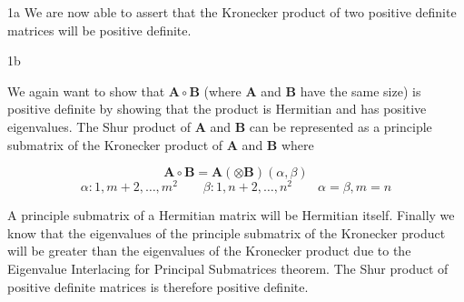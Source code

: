 \documentclass[11pt]{article}
\begin{document}
\begin{homeworkProblem}
\begin{homeworkSection}{1a}
        We are now able to assert that the Kronecker product of two positive
        definite matrices will be positive definite.

    \end{homeworkSection}

    \clearpage

    \begin{homeworkSection}{1b}
    
        We again want to show that $\bm{A} \circ \bm{B}$ (where $\bm{A}$ and
        $\bm{B}$ have the same size) is positive definite by showing that the
        product is Hermitian and has positive eigenvalues. The Shur product of
        $\bm{A}$ and $\bm{B}$ can be represented as a principle submatrix of
        the Kronecker product of $\bm{A}$ and $\bm{B}$ where
        
        \begin{equation*}
            \bm{A} \circ \bm{B} = \bm{A} (\otimes \bm{B})(\alpha, \beta)
        \end{equation*}
        \begin{equation*}
            \alpha : {1, m+2, \dots, m^2} \qquad
            \beta : {1, n+2, \dots, n^2} \qquad \alpha = \beta, m = n
        \end{equation*}
        
        A principle submatrix
        of a Hermitian matrix will be Hermitian itself. Finally we know that
        the eigenvalues of the principle submatrix of the Kronecker product
        will be greater than the eigenvalues of the Kronecker product due to
        the Eigenvalue Interlacing for Principal Submatrices theorem. The Shur
        product of positive definite matrices is therefore positive definite.


    \end{homeworkSection}

\end{homeworkProblem}
\end{document}
